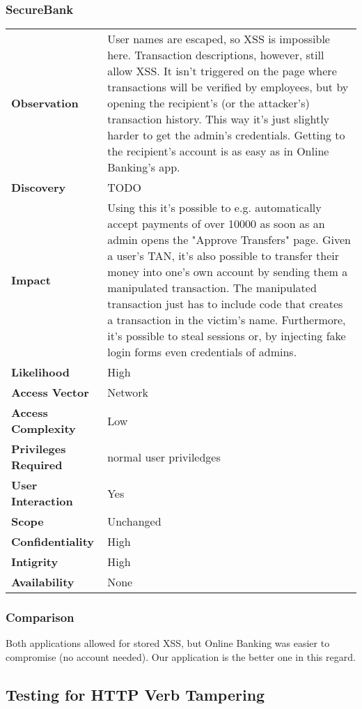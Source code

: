 \subsubsection*{SecureBank}

\begin{tabular}{l|p{10cm}}
\textbf{Observation} & User names are escaped, so XSS is impossible here. Transaction descriptions, however, still allow XSS. It isn't triggered on the page where transactions will be verified by employees, but by opening the recipient's (or the attacker's) transaction history. This way it's just slightly harder to get the admin's credentials. Getting to the recipient's account is as easy as in Online Banking's app. \\
\textbf{Discovery} & TODO \\
\textbf{Impact} & Using this it's possible to e.g. automatically accept payments of over 10000 as soon as an admin opens the "Approve Transfers" page. Given a user's TAN, it's also possible to transfer their money into one's own account by sending them a manipulated transaction. The manipulated transaction just has to include code that creates a transaction in the victim's name. Furthermore, it's possible to steal sessions or, by injecting fake login forms even credentials of admins. \\
\textbf{Likelihood} & High \\
\textbf{Access Vector} & Network \\
\textbf{Access Complexity} & Low\\
\textbf{Privileges Required} & normal user priviledges \\
\textbf{User Interaction} & Yes\\
\textbf{Scope} & Unchanged \\
\textbf{Confidentiality} & High\\
\textbf{Intigrity} & High \\
\textbf{Availability} & None\\
\end{tabular}

\subsubsection*{Comparison}
Both applications allowed for stored XSS, but Online Banking was easier to compromise (no account needed).
Our application is the better one in this regard.

\subsection{Testing for HTTP Verb Tampering}

